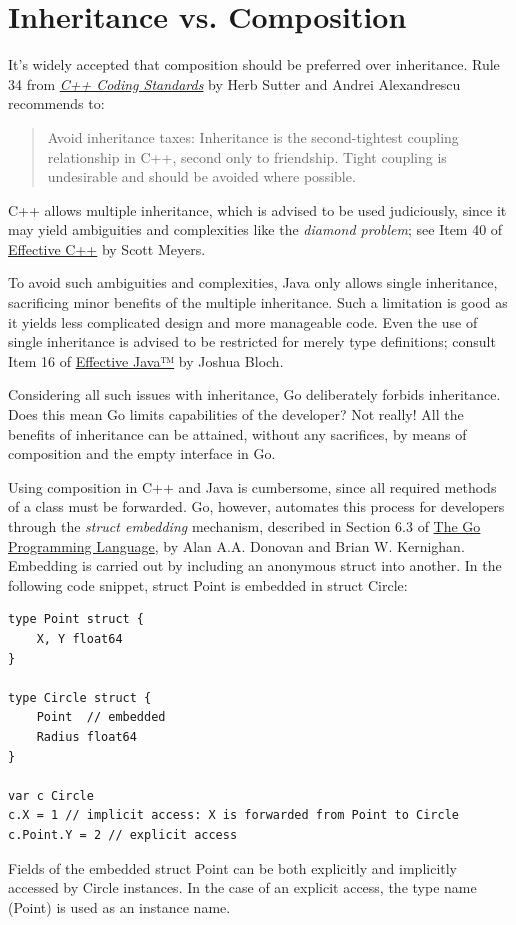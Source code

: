 \documentclass[11pt]{article}
\begin{document}
\section{Inheritance vs. Composition}
\label{sec:orgheadline10}
It's widely accepted that composition should be preferred over inheritance. Rule 34 from \href{http://www.gotw.ca/publications/c++cs.htm}{\emph{C++ Coding Standards}} by Herb Sutter and Andrei Alexandrescu recommends to:
\begin{quote}
Avoid inheritance taxes: Inheritance is the second-tightest coupling relationship in C++, second only to friendship. Tight coupling is undesirable and should be avoided where possible.
\end{quote}
C++ allows multiple inheritance, which is advised to be used judiciously, since it may yield ambiguities and complexities like the \emph{diamond problem}; see Item 40 of \href{http://www.aristeia.com/books.html}{Effective C++} by Scott Meyers.

To avoid such ambiguities and complexities, Java only allows single inheritance, sacrificing minor benefits of the multiple inheritance. Such a limitation is good as it yields less complicated design and more manageable code. Even the use of single inheritance is advised to be restricted for merely type definitions; consult Item 16 of \href{https://www.safaribooksonline.com/library/view/effective-java-2nd/9780137150021/}{Effective Java™} by Joshua Bloch.

Considering all such issues with inheritance, Go deliberately forbids inheritance. Does this mean Go limits capabilities of the developer? Not really! All the benefits of inheritance can be attained, without any sacrifices, by means of composition and the empty interface in Go.

Using composition in C++ and Java is cumbersome, since all required methods of a class must be forwarded. Go, however, automates this process for developers through the \emph{struct embedding} mechanism, described in Section 6.3 of \href{https://dl.acm.org/citation.cfm?id=2851099}{The Go Programming Language}, by Alan A.A. Donovan and Brian W. Kernighan. Embedding is carried out by including an anonymous struct into another. In the following code snippet, struct Point is embedded in struct Circle:
\begin{verbatim}
type Point struct {
    X, Y float64
}

type Circle struct {
    Point  // embedded
    Radius float64
}

var c Circle
c.X = 1 // implicit access: X is forwarded from Point to Circle
c.Point.Y = 2 // explicit access
\end{verbatim}
Fields of the embedded struct Point can be both explicitly and implicitly accessed by Circle instances. In the case of an explicit access, the type name (Point) is used as an instance name.
\end{document}
